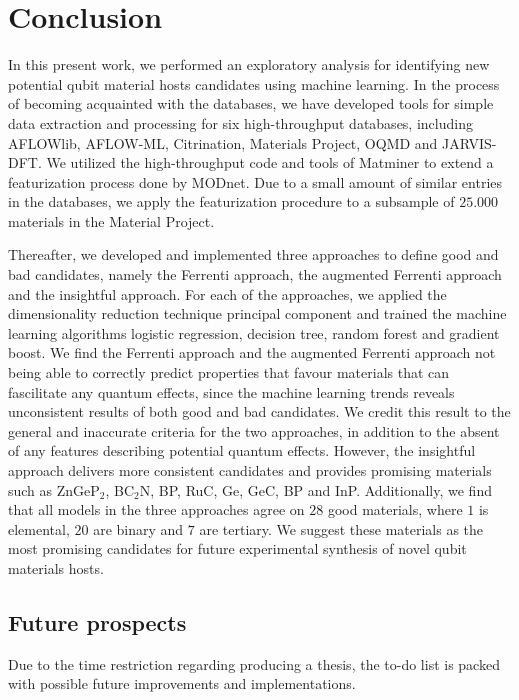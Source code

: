 \chapter*{Conclusion}

In this present work, we performed an exploratory analysis for identifying new potential qubit material hosts candidates using machine learning. In the process of becoming acquainted with the databases, we have developed tools for simple data extraction and processing for six high-throughput databases, including AFLOWlib, AFLOW-ML, Citrination, Materials Project, OQMD and JARVIS-DFT. We utilized the high-throughput code and tools of Matminer to extend a featurization process done by MODnet. Due to a small amount of similar entries in the databases, we apply the featurization procedure to a subsample of $25.000$ materials in the Material Project.

Thereafter, we developed and implemented three approaches to define good and bad candidates, namely the Ferrenti approach, the augmented Ferrenti approach and the insightful approach. For each of the approaches, we applied the dimensionality reduction technique principal component and trained the machine learning algorithms logistic regression, decision tree, random forest and gradient boost. We find the Ferrenti approach and the augmented Ferrenti approach not being able to correctly predict properties that favour materials that can fascilitate any quantum effects, since the machine learning trends reveals unconsistent results of both good and bad candidates. We credit this result to the general and inaccurate criteria for the two approaches, in addition to the absent of any features describing potential quantum effects. However, the insightful approach delivers more consistent candidates and provides promising materials such as ZnGeP$_2$, BC$_2$N, BP, RuC, Ge, GeC, BP and InP. Additionally, we find that all models in the three approaches agree on $28$ good materials, where $1$ is elemental, $20$ are binary and $7$ are tertiary. We suggest these materials as the most promising candidates for future experimental synthesis of novel qubit materials hosts. %
\clearpage
\section*{Future prospects}

Due to the time restriction regarding producing a thesis, the to-do list is packed with possible future improvements and implementations.
\vspace{10pt}

